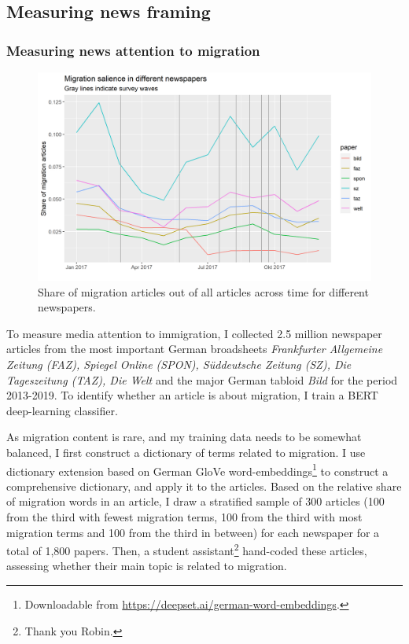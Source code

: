 \documentclass{article}
\begin{document}
\subsection{Measuring news framing}

\subsubsection{Measuring news attention to migration}

\begin{figure}[!ht]
    \centering
    \includegraphics[width=\textwidth]{paper/vis/salience_papers_focus.png}
    \caption{Share of migration articles out of all articles across time for different newspapers.}
    \label{fig:salience}
\end{figure}

To measure media attention to immigration, I collected 2.5 million newspaper articles from the most important German broadsheets \textit{Frankfurter Allgemeine Zeitung (FAZ), Spiegel Online (SPON), Süddeutsche Zeitung (SZ), Die Tageszeitung (TAZ), Die Welt} and the major German tabloid \textit{Bild} for the period 2013-2019. To identify whether an article is about migration, I train a BERT deep-learning classifier. 

As migration content is rare, and my training data needs to be somewhat balanced, I first construct a dictionary of terms related to migration. I use dictionary extension based on German GloVe word-embeddings\footnote{Downloadable from \url{https://deepset.ai/german-word-embeddings}.} to construct a comprehensive dictionary, and apply it to the articles. Based on the relative share of migration words in an article, I draw a stratified sample of 300 articles (100 from the third with fewest migration terms, 100 from the third with most migration terms and 100 from the third in between) for each newspaper for a total of 1,800 papers. Then, a student assistant\footnote{Thank you Robin.} hand-coded these articles, assessing whether their main topic is related to migration. 
\end{document}
